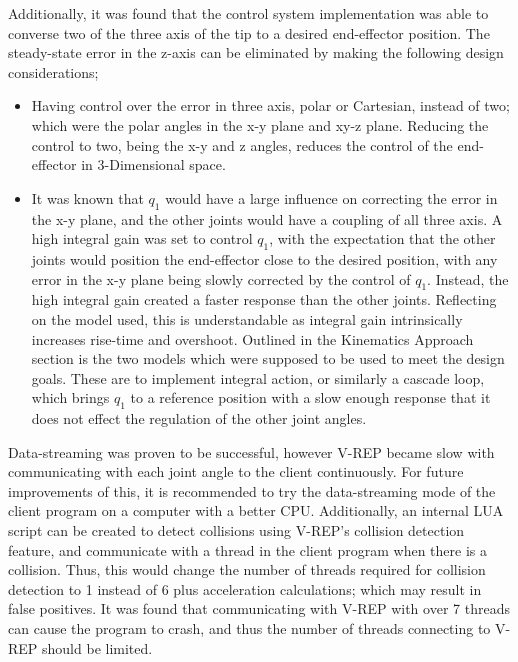 \documentclass[12pt,openany,a4paper]{book}
\begin{document}
Additionally, it was found that the control system implementation was able to converse two of the three axis of the tip to a desired end-effector position. The steady-state error in the z-axis can be eliminated by making the following design considerations;

\begin{itemize}

	\item Having control over the error in three axis, polar or Cartesian, instead of two; which were the polar angles in the x-y plane and xy-z plane. Reducing the control to two, being the x-y and z angles, reduces the control of the end-effector in 3-Dimensional space.
	\item It was known that $q_1$ would have a large influence on correcting the error in the x-y plane, and the other joints would have a coupling of all three axis. A high integral gain was set to control $q_1$, with the expectation that the other joints would position the end-effector close to the desired position, with any error in the x-y plane being slowly corrected by the control of $q_1$. Instead, the high integral gain created a faster response than the other joints. Reflecting on the model used, this is understandable as integral gain intrinsically increases rise-time and overshoot. Outlined in the Kinematics Approach section is the two models which were supposed to be used to meet the design goals. These are to implement integral action, or similarly a cascade loop, which brings $q_1$ to a reference position with a slow enough response that it does not effect the regulation of the other joint angles.

\end{itemize}

Data-streaming was proven to be successful, however V-REP became slow with communicating with each joint angle to the client continuously. For future improvements of this, it is recommended to try the data-streaming mode of the client program on a computer with a better CPU. Additionally, an internal LUA script can be created to detect collisions using V-REP's collision detection feature, and communicate with a thread in the client program when there is a collision. Thus, this would change the number of threads required for collision detection to 1 instead of 6 plus acceleration calculations; which may result in false positives. It was found that communicating with V-REP with over 7 threads can cause the program to crash, and thus the number of threads connecting to V-REP should be limited.
\end{document}
